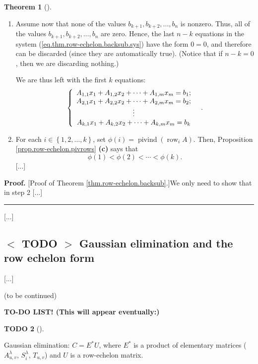 \documentclass[numbers=enddot,12pt,final,onecolumn,notitlepage]{scrartcl}%
\theoremstyle{definition}
\newtheorem{theo}{Theorem}[section]
\newenvironment{theorem}[1][]
{\begin{theo}[#1]\begin{leftbar}}
{\end{leftbar}\end{theo}}
\newtheorem{quest}[theo]{TODO}
\newenvironment{todo}[1][]
{\begin{quest}[#1]\begin{leftbar}}
{\end{leftbar}\end{quest}}
\newenvironment{proof}[1][Proof]{\noindent\textbf{#1.} }{\ \rule{0.5em}{0.5em}}
\begin{document}
\begin{theorem}
\begin{enumerate}
\item Assume now that none of the values $b_{k+1},b_{k+2},\ldots,b_{n}$ is
nonzero. Thus, all of the values $b_{k+1},b_{k+2},\ldots,b_{n}$ are zero.
Hence, the last $n-k$ equations in the system
(\ref{eq.thm.row-echelon.backsub.sys}) have the form $0=0$, and therefore can
be discarded (since they are automatically true). (Notice that if $n-k=0$,
then we are discarding nothing.)

We are thus left with the first $k$ equations:%
\begin{equation}
\left\{
\begin{array}
[c]{c}%
A_{1,1}x_{1}+A_{1,2}x_{2}+\cdots+A_{1,m}x_{m}=b_{1};\\
A_{2,1}x_{1}+A_{2,2}x_{2}+\cdots+A_{2,m}x_{m}=b_{2};\\
\vdots\\
A_{k,1}x_{1}+A_{k,2}x_{2}+\cdots+A_{k,m}x_{m}=b_{k}%
\end{array}
\right.  \ \ . \label{eq.thm.row-echelon.backsub.sysk}%
\end{equation}


\item For each $i\in\left\{  1,2,\ldots,k\right\}  $, set $\phi\left(
i\right)  =\operatorname*{pivind}\left(  \operatorname*{row}\nolimits_{i}%
A\right)  $. Then, Proposition \ref{prop.row-echelon.pivrows} \textbf{(c)}
says that%
\[
\phi\left(  1\right)  <\phi\left(  2\right)  <\cdots<\phi\left(  k\right)  .
\]
[...]
\end{enumerate}
\end{theorem}

\begin{proof}
[Proof of Theorem \ref{thm.row-echelon.backsub}.]We only need to show that in
step 2 [...]
\end{proof}

[...]

\subsection{\label{sect.gauss.gauss}%
$<$%
TODO%
$>$
Gaussian elimination and the row echelon form}

[...]

(to be continued)

\textbf{TO-DO LIST! (This will appear eventually:)}

\begin{todo}
Gaussian elimination: $C=E^{\ast}U$, where $E^{\ast}$ is a product of
elementary matrices ($A_{u,v}^{\lambda}$, $S_{i}^{\lambda}$, $T_{u,v}$) and
$U$ is a row-echelon matrix.
\end{todo}
\end{document}
